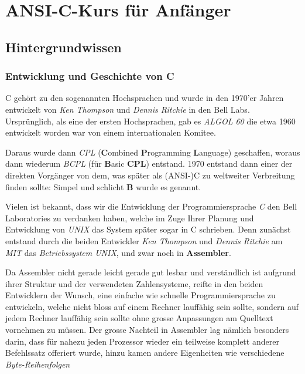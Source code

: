\documentclass[b5paper,10pt,dvips,fleqn,titlepage,twoside]{book}
\begin{document}
\part{ANSI-C-Kurs für Anfänger}
\label{part:ansic}
\chapter{Hintergrundwissen}
\section{Entwicklung und Geschichte von C}
C gehört zu den sogenannten Hochsprachen und wurde in den 1970'er Jahren entwickelt von \emph{Ken Thompson} und \emph{Dennis Ritchie} in den Bell Labs. Ursprünglich, als eine der ersten Hochsprachen, gab es \emph{ALGOL 60} die etwa 1960 entwickelt worden war von einem internationalen Komitee.

Daraus wurde dann \emph{CPL} (\textbf{C}ombined \textbf{P}rogramming \textbf{L}anguage) geschaffen, woraus dann wiederum \emph{BCPL} (für \textbf{B}asic \textbf{CPL}) entstand. 1970 entstand dann einer der direkten Vorgänger von dem, was später als (ANSI-)C zu weltweiter Verbreitung finden sollte: Simpel und schlicht \textbf{B} wurde es genannt.

Vielen ist bekannt, dass wir die Entwicklung der Programmiersprache \emph{C} den Bell Laboratories zu verdanken haben, welche im Zuge Ihrer Planung und Entwicklung von \emph{UNIX} das System später sogar in C schrieben.
Denn zunächst entstand durch die beiden Entwickler \emph{Ken Thompson} und \emph{Dennis Ritchie} am \emph{MIT} das \emph{Betriebssystem UNIX}, und zwar noch in \textbf{Assembler}.
\newline


Da Assembler nicht gerade leicht gerade gut lesbar und verständlich ist aufgrund ihrer Struktur und der verwendeten Zahlensysteme, reifte in den beiden Entwicklern der Wunsch, eine einfache wie schnelle Programmiersprache zu entwickeln, welche nicht bloss auf einem Rechner lauffähig sein sollte, sondern auf jedem Rechner lauffähig sein sollte ohne grosse Anpassungen am Quelltext vornehmen zu müssen.\newline
Der grosse Nachteil in Assembler lag nämlich besonders darin, dass für nahezu jeden Prozessor wieder ein teilweise komplett anderer Befehlssatz offeriert wurde, hinzu kamen andere Eigenheiten wie verschiedene \textit{Byte-Reihenfolgen}
\end{document}
